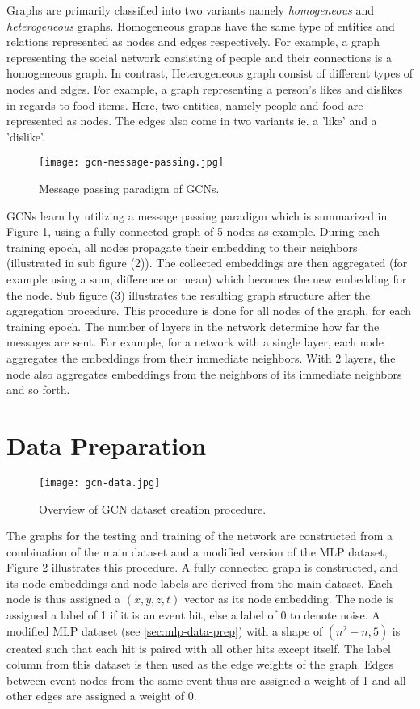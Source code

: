 Graphs are primarily classified into two variants namely
\emph{homogeneous} and \emph{heterogeneous} graphs. Homogeneous graphs
have the same type of entities and relations represented as nodes and
edges respectively. For example, a graph representing the social
network consisting of people and their connections is a homogeneous
graph. In contrast, Heterogeneous graph consist of different types of
nodes and edges. For example, a graph representing a person's likes
and dislikes in regards to food items. Here, two entities, namely
people and food are represented as nodes. The edges also come in two
variants ie. a 'like' and a 'dislike'.

\begin{figure}[htb]
  \centering
  \texttt{[image: gcn-message-passing.jpg]}
  \caption{Message passing paradigm of GCNs.}
  \label{fig:gcn-message-passing}
\end{figure}
  
GCNs learn by utilizing a message passing paradigm which is summarized
in Figure \ref{fig:gcn-message-passing}, using a fully connected graph
of 5 nodes as example. During each training epoch, all nodes propagate
their embedding to their neighbors (illustrated in sub figure (2)).
The collected embeddings are then aggregated (for example using a sum,
difference or mean) which becomes the new embedding for the node. Sub
figure (3) illustrates the resulting graph structure after the
aggregation procedure. This procedure is done for all nodes of the
graph, for each training epoch. The number of layers in the network
determine how far the messages are sent. For example, for a network
with a single layer, each node aggregates the embeddings from their
immediate neighbors. With 2 layers, the node also aggregates
embeddings from the neighbors of its immediate neighbors and so forth.

\section{Data Preparation}
\label{sec:gcn-data-prep}

\begin{figure}[htb]
  \centering
  \texttt{[image: gcn-data.jpg]}
  \caption{Overview of GCN dataset creation procedure.}
  \label{fig:gcn-data}
\end{figure}

The graphs for the testing and training of the network are constructed
from a combination of the main dataset and a modified version of the
MLP dataset, Figure \ref{fig:gcn-data} illustrates this procedure. A
fully connected graph is constructed, and its node embeddings and node
labels are derived from the main dataset. Each node is thus assigned a
$(x,y,z,t)$ vector as its node embedding. The node is assigned a label
of 1 if it is an event hit, else a label of 0 to denote noise. A
modified MLP dataset (see \ref{sec:mlp-data-prep}) with a shape of
\texttt{$(n^{2}-n, 5)$} is created such that each hit is paired with
all other hits except itself. The label column from this dataset is
then used as the edge weights of the graph. Edges between event nodes
from the same event thus are assigned a weight of 1 and all other
edges are assigned a weight of 0.

